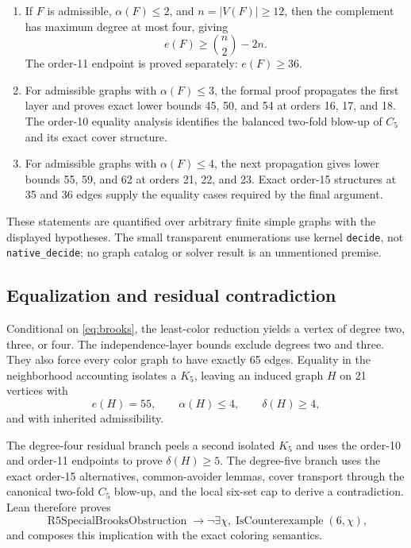 \documentclass[11pt,reqno,a4paper]{amsart}
\theoremstyle{definition}
\theoremstyle{remark}
\newcommand{\code}[1]{\texttt{#1}}
\begin{document}
\begin{enumerate}[leftmargin=2.2em]
\item If \(F\) is admissible, \(\alpha(F)\le2\), and \(n=|V(F)|\ge12\),
then the complement has maximum degree at most four, giving
\[
  e(F)\ge\binom n2-2n.
\]
The order-11 endpoint is proved separately: \(e(F)\ge36\).

\item For admissible graphs with \(\alpha(F)\le3\), the formal proof
propagates the first layer and proves exact lower bounds 45, 50, and 54 at
orders 16, 17, and 18.  The order-10 equality analysis identifies the
balanced two-fold blow-up of \(C_5\) and its exact cover structure.

\item For admissible graphs with \(\alpha(F)\le4\), the next propagation
gives lower bounds 55, 59, and 62 at orders 21, 22, and 23.  Exact
order-15 structures at 35 and 36 edges supply the equality cases required
by the final argument.
\end{enumerate}

These statements are quantified over arbitrary finite simple graphs with the
displayed hypotheses.  The small transparent enumerations use kernel
\code{decide}, not \code{native\_decide}; no graph catalog or solver result is
an unmentioned premise.

\subsection{Equalization and residual contradiction}

Conditional on \eqref{eq:brooks}, the least-color reduction yields a vertex
of degree two, three, or four.  The independence-layer bounds exclude
degrees two and three.  They also force every color graph to have exactly 65
edges.  Equality in the neighborhood accounting isolates a \(K_5\), leaving
an induced graph \(H\) on 21 vertices with
\[
  e(H)=55,\qquad \alpha(H)\le4,\qquad
  \delta(H)\ge4,
\]
and with inherited admissibility.

The degree-four residual branch peels a second isolated \(K_5\) and uses the
order-10 and order-11 endpoints to prove \(\delta(H)\ge5\).  The degree-five
branch uses the exact order-15 alternatives, common-avoider lemmas, cover
transport through the canonical two-fold \(C_5\) blow-up, and the local
six-set cap to derive a contradiction.  Lean therefore proves
\[
  \operatorname{R5SpecialBrooksObstruction}
  \longrightarrow
  \neg\exists\chi,\operatorname{IsCounterexample}(6,\chi),
\]
and composes this implication with the exact coloring semantics.
\end{document}
